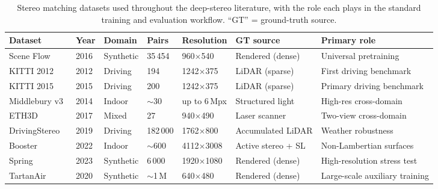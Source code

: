 \begin{table}[!htbp]
\centering
\caption{Stereo matching datasets used throughout the deep-stereo literature, with the role each plays in the standard training and evaluation workflow. ``GT'' = ground-truth source.}
\label{tab:datasets}
\renewcommand{\arraystretch}{1.1}
\footnotesize
\begin{tabular}{lllllll}
\toprule
\textbf{Dataset} & \textbf{Year} & \textbf{Domain} & \textbf{Pairs} & \textbf{Resolution} & \textbf{GT source} & \textbf{Primary role} \\
\midrule
Scene Flow~\cite{mayer2016sceneflow}        & 2016 & Synthetic & 35\,454 & 960$\times$540  & Rendered (dense) & Universal pretraining \\
KITTI 2012~\cite{geiger2012kitti}           & 2012 & Driving   & 194    & 1242$\times$375 & LiDAR (sparse)   & First driving benchmark \\
KITTI 2015~\cite{menze2015kitti}            & 2015 & Driving   & 200    & 1242$\times$375 & LiDAR (sparse)   & Primary driving benchmark \\
Middlebury v3~\cite{scharstein2014middlebury} & 2014 & Indoor   & $\sim$30 & up to 6\,Mpx  & Structured light & High-res cross-domain \\
ETH3D~\cite{schops2017eth3d}                & 2017 & Mixed     & 27     & 940$\times$490  & Laser scanner    & Two-view cross-domain \\
DrivingStereo~\cite{yang2019drivingstereo}  & 2019 & Driving   & 182\,000 & 1762$\times$800 & Accumulated LiDAR & Weather robustness \\
Booster~\cite{ramirez2022booster}           & 2022 & Indoor    & $\sim$600 & 4112$\times$3008 & Active stereo + SL & Non-Lambertian surfaces \\
Spring~\cite{mehl2023spring}                & 2023 & Synthetic & 6\,000  & 1920$\times$1080 & Rendered (dense) & High-resolution stress test \\
TartanAir~\cite{wang2020tartanair}          & 2020 & Synthetic & $\sim$1\,M & 640$\times$480 & Rendered (dense) & Large-scale auxiliary training \\
\bottomrule
\end{tabular}
\end{table}

